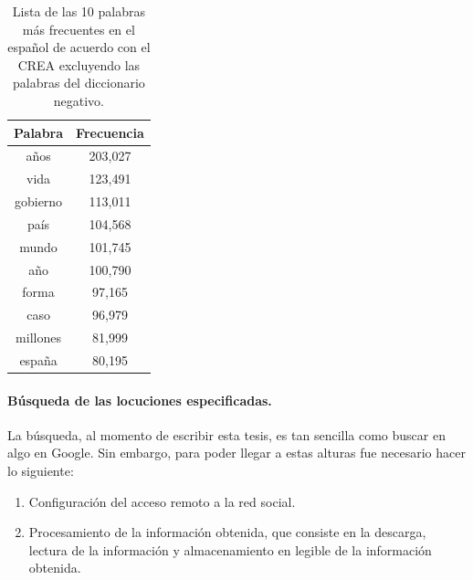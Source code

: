\begin{table}[h]
	\caption{Lista de las 10 palabras más frecuentes en el español de acuerdo con el CREA excluyendo las palabras del diccionario negativo.}
	\label{tb:creafreq_filtered}
	\centering
	\begin{tabular}{|c|c|}
		\hline
		\textbf{Palabra} & \textbf{Frecuencia} \\ \hline
		años             & 203,027             \\ \hline
		vida             & 123,491             \\ \hline
		gobierno         & 113,011             \\ \hline
		país             & 104,568             \\ \hline
		mundo            & 101,745             \\ \hline
		año              & 100,790             \\ \hline
		forma            & 97,165              \\ \hline
		caso             & 96,979              \\ \hline
		millones         & 81,999              \\ \hline
		españa           & 80,195              \\ \hline
	\end{tabular}
\end{table}

\paragraph{Búsqueda de las locuciones especificadas.} La búsqueda, al momento de escribir esta tesis, es tan sencilla como buscar en algo en Google. Sin embargo, para poder llegar a estas alturas fue necesario hacer lo siguiente:
\begin{enumerate}
	\item Configuración del acceso remoto a la red social.
	\item Procesamiento de la información obtenida, que consiste en la descarga, lectura de la información y almacenamiento en legible de la información obtenida.
\end{enumerate}

